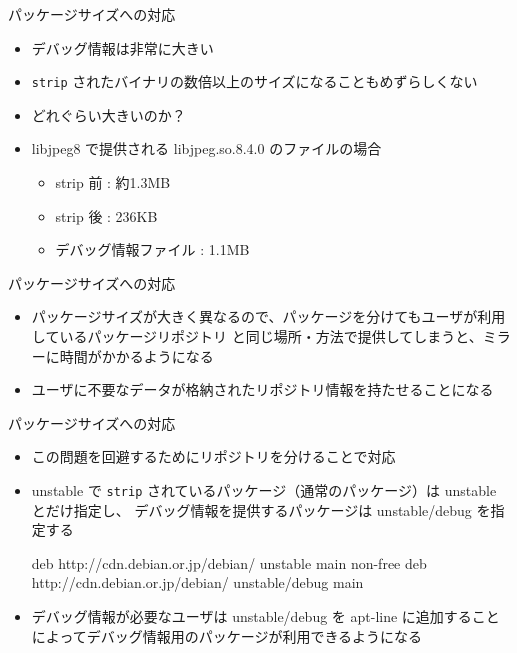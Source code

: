 \begin{frame}{パッケージサイズへの対応}
\pause
\begin{itemize}[<+->]
\item デバッグ情報は非常に大きい
\item \texttt{strip} されたバイナリの数倍以上のサイズになることもめずらしくない
\item どれぐらい大きいのか？
\item libjpeg8 で提供される libjpeg.so.8.4.0 のファイルの場合
\begin{itemize}
\item strip 前             : 約1.3MB 
\item strip 後             : 236KB\
\item デバッグ情報ファイル : 1.1MB 
\end{itemize}
\end{itemize}
\end{frame}

\begin{frame}[containsverbatim]{パッケージサイズへの対応}
\begin{itemize}
\item パッケージサイズが大きく異なるので、パッケージを分けてもユーザが利用しているパッケージリポジトリ
と同じ場所・方法で提供してしまうと、ミラーに時間がかかるようになる
\item ユーザに不要なデータが格納されたリポジトリ情報を持たせることになる
\end{itemize}
\end{frame}

\begin{frame}[containsverbatim]{パッケージサイズへの対応}
\begin{itemize}
\item この問題を回避するためにリポジトリを分けることで対応
\item unstable で \texttt{strip} されているパッケージ（通常のパッケージ）は unstable とだけ指定し、
デバッグ情報を提供するパッケージは unstable/debug を指定する

\begin{commandline}
deb http://cdn.debian.or.jp/debian/ unstable main non-free
deb http://cdn.debian.or.jp/debian/ unstable/debug main
\end{commandline}

\item デバッグ情報が必要なユーザは unstable/debug を apt-line に追加することによってデバッグ情報用のパッケージが利用できるようになる
\end{itemize}
\end{frame}

